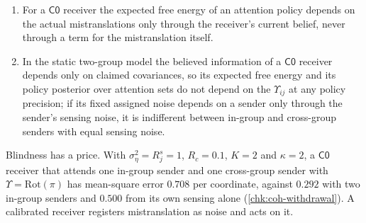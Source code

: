 \begin{proposition}\label{prop:coh-c0-blind}
\begin{enumerate}\renewcommand{\labelenumi}{(\alph{enumi})}
\item For a $\mathsf{C0}$ receiver the expected free energy of an attention policy depends on the actual mistranslations only through the receiver's current belief, never through a term for the mistranslation itself.
\item In the static two-group model the believed information of a $\mathsf{C0}$ receiver depends only on claimed covariances, so its expected free energy and its policy posterior over attention sets do not depend on the $\Upsilon_{ij}$ at any policy precision; if its fixed assigned noise depends on a sender only through the sender's sensing noise, it is indifferent between in-group and cross-group senders with equal sensing noise.
\end{enumerate}
\end{proposition}

Blindness has a price. With $\sigma_\eta^2=R^s_j=1$, $R_c=0.1$, $K=2$ and $\kappa=2$, a $\mathsf{C0}$ receiver that attends one in-group sender and one cross-group sender with $\Upsilon=\mathrm{Rot}(\pi)$ has mean-square error $0.708$ per coordinate, against $0.292$ with two in-group senders and $0.500$ from its own sensing alone (\cref{chk:coh-withdrawal}). A calibrated receiver registers mistranslation as noise and acts on it.

